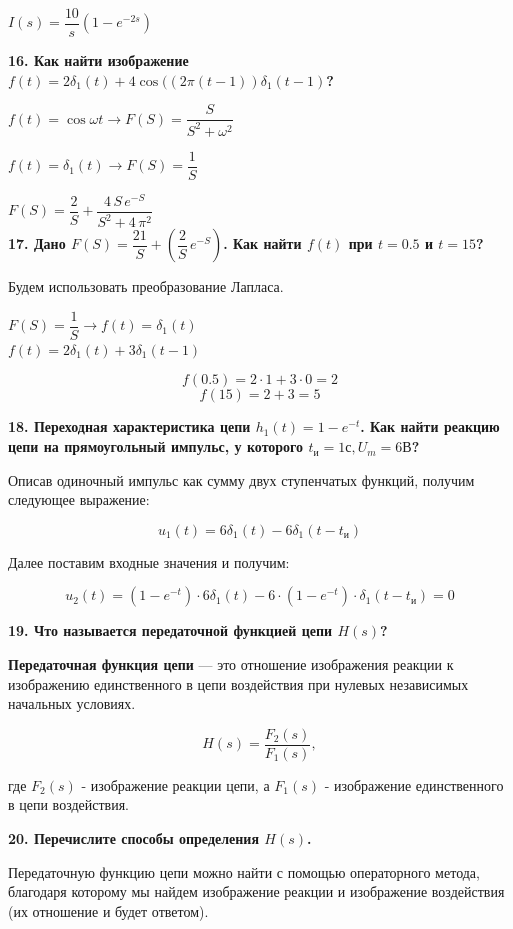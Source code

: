 $ I(s) = \dfrac{10}{s}(1 - e^{-2s}) $

\textbf{
    16. Как найти изображение\\
    $ f(t) = 2\delta_{1}(t) + 
    4\cos((2\pi(t-1))\delta_{1}(t-1) $?
}

$ f(t) = \cos \omega t \rightarrow 
F(S) = \dfrac{S}{S^{2} + \omega^{2}}
$

$ f(t) = \delta_{1}(t) \rightarrow F(S) = \dfrac{1}{S} $


$ F(S) = \dfrac{2}{S} + \dfrac{4 \, S \, e^{-S}}{S^{2} + 4 \, \pi^{2}} $ 
\\

\textbf{
    17. Дано 
    $ F(S) = \dfrac{21}{S} + (\dfrac{2}{S} \, e^{-S}) $. 
    Как найти $ f(t) $ при 
    $ t = 0.5 $ и $ t = 15 $?
}

Будем использовать преобразование Лапласа.

$ F(S) =  \dfrac{1}{S} \rightarrow 
f(t) = \delta_{1}(t)  $ \\

$ f(t) = 2\delta_{1}(t) + 3\delta_{1}(t - 1) $
 
$$ f(0.5) = 2 \cdot 1 + 3 \cdot 0 = 2 $$
$$ f(15) = 2 + 3 = 5 $$

\textbf{
    18. Переходная характеристика цепи 
    $ h_{1}(t) = 1 - e^{-t} $. 
    Как найти реакцию цепи на прямоугольный импульс, 
    у которого $ t_{и} = 1 с, U_{m} = 6 В $?
} 

Описав одиночный импульс 
как сумму двух ступенчатых функций, 
получим следующее выражение: 

$$ u_1(t) = 6\delta_{1}(t) - 6\delta_{1}(t - t_{и}) $$

Далее поставим входные значения и получим:

$$ u_{2}(t) = (1 - e^{-t}) \cdot 6\delta_{1}(t) - 6 \cdot (1 - e^{-t}) \cdot \delta_{1}(t - t_{и}) = 0 $$

\textbf{
    19. Что называется 
    передаточной функцией цепи $ H(s) $?
}

\textbf{Передаточная функция цепи} --- 
это отношение изображения реакции 
к изображению единственного в цепи воздействия 
при нулевых независимых начальных условиях.

$$ H(s) = \dfrac{F_{2}(s)}{F_{1}(s)}, $$ 

где 
$ F_{2}(s) $ - изображение реакции цепи, а 
$ F_{1}(s) $ - изображение единственного в цепи воздействия. 

\textbf{
    20. Перечислите способы определения $ H(s) $.
}

Передаточную функцию цепи можно найти 
с помощью операторного метода, 
благодаря которому мы найдем изображение реакции 
и изображение воздействия (их отношение и будет ответом).

